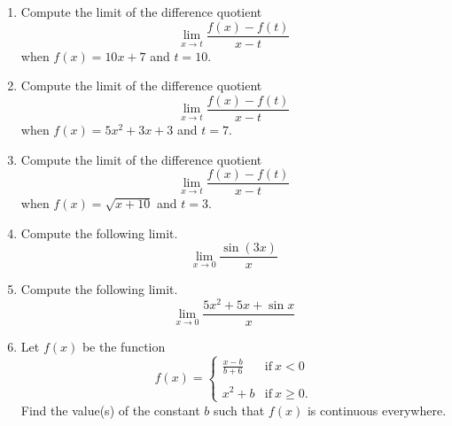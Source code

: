 \documentclass{article}
\begin{document}
\ActivityTitle[class=Calculus I, number=2, name=Continuity]

\begin{enumerate}
\item Compute the limit of the difference quotient \[ \lim_{x \rightarrow t} \frac{f(x) - f(t)}{x - t} \] when $f(x) = 10 x + 7$ and $t = 10$.



  
\vspace{5cm}

\item Compute the limit of the difference quotient \[ \lim_{x \rightarrow t} \frac{f(x) - f(t)}{x - t} \] when $f(x) = 5 x^2 + 3 x + 3$ and $t = 7$.



  
\vspace{5cm}

\item Compute the limit of the difference quotient \[ \lim_{x \rightarrow t} \frac{f(x) - f(t)}{x - t} \] when $f(x) = \sqrt{x + 10}$ and $t = 3$.



  
\vspace{5cm}

\item Compute the following limit. \[ \lim_{x \rightarrow 0} \frac{\sin(3 x)}{x} \]



  
\vspace{5cm}

\item Compute the following limit. \[ \lim_{x \rightarrow 0} \frac{5 x^2 + 5 x + \sin x}{x} \]



  
\vspace{5cm}

\item Let $f(x)$ be the function \[ f(x) = \left\{ \begin{array}{ll} \frac{x-b}{b + 6} & \mathrm{if}\ x < 0 \\ & \\ x^2 + b & \mathrm{if}\ x \geq 0. \end{array}\right. \] Find the value(s) of the constant $b$ such that $f(x)$ is continuous everywhere.



  
\vspace{5cm}
\end{enumerate}
\end{document}
